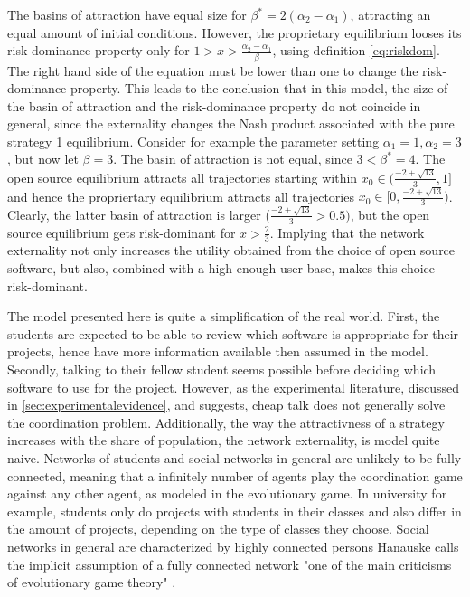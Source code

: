 \documentclass[11pt]{article}
\begin{document}
The basins of attraction have equal size for $\beta^* = 2 (\alpha_2 -\alpha_1)$,
attracting an equal amount of initial conditions. However,
the proprietary equilibrium looses its risk-dominance property 
only for $1 > x > \frac{\alpha_2-\alpha_1}{\beta}  $, using definition 
\ref{eq:riskdom}. The right hand side of the equation must be lower than one 
to change the risk-dominance property. This leads to the conclusion 
that in this model, the size of the basin of attraction and the risk-dominance
property do not coincide in general, since the externality changes the Nash 
product associated with the pure strategy 1 equilibrium. Consider for example 
the parameter setting $\alpha_1 =1, \alpha_2=3$, but now let $\beta=3$. 
The basin of attraction is not equal, since $3<\beta^*= 4$. 
The open source equilibrium attracts all trajectories starting within 
$x_0 \in (\frac{-2+\sqrt{13}}{3},1]$ and hence the propriertary equilibrium attracts
all trajectories $x_0 \in [0,\frac{-2+\sqrt{13}}{3})$. Clearly, the latter basin of 
attraction is larger ($\frac{-2+\sqrt{13}}{3}>0.5)$, 
but the open source equilibrium gets risk-dominant for
$x>\frac 23$. Implying that the network externality not only increases the
utility obtained from the choice of open source software, but also,
combined with a high enough user base, makes this choice risk-dominant.

The model presented here is quite a simplification of the real world. 
First, the students are expected to be able to review which software is 
appropriate for their projects, hence have more information available then 
assumed in the model. Secondly, talking to their fellow student seems
possible before deciding which software to use for the project. 
However, as the experimental literature, discussed in 
\ref{sec:experimentalevidence}, and \textcite{aumann_nash_1990} suggests, 
cheap talk does not generally solve the coordination problem. 
Additionally, the way the attractivness of a strategy increases with 
the share of population, the network externality, is model quite naive.
Networks of students and social networks in general are unlikely to be fully
connected, meaning that a infinitely number of agents play the coordination
game against any other agent, as modeled in the evolutionary game. 
In university for example, students only do projects with students in their 
classes and also differ in the amount of projects, depending on the type of 
classes they choose. Social networks
in general are characterized by highly connected persons 
Hanauske calls the implicit assumption of a
fully connected network "one of the main criticisms of evolutionary game
theory" \parencite{hanauske_evolutionare_2011}.
\end{document}
